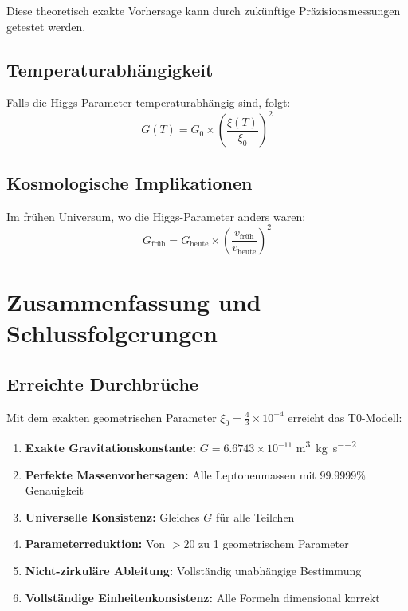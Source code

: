\documentclass[12pt,a4paper]{article}
\newcommand{\xiconst}{\xi_0 = \frac{4}{3} \times 10^{-4}}
\theoremstyle{definition}
\begin{document}
	Diese theoretisch exakte Vorhersage kann durch zukünftige Präzisionsmessungen getestet werden.
	
	\subsection{Temperaturabhängigkeit}
	
	Falls die Higgs-Parameter temperaturabhängig sind, folgt:
	\begin{equation}
		G(T) = G_0 \times \left(\frac{\xi(T)}{\xi_0}\right)^2
	\end{equation}
	
	\subsection{Kosmologische Implikationen}
	
	Im frühen Universum, wo die Higgs-Parameter anders waren:
	\begin{equation}
		G_{\text{früh}} = G_{\text{heute}} \times \left(\frac{v_{\text{früh}}}{v_{\text{heute}}}\right)^2
	\end{equation}
	
	\section{Zusammenfassung und Schlussfolgerungen}
	
	\subsection{Erreichte Durchbrüche}
	
	Mit dem exakten geometrischen Parameter $\xiconst$ erreicht das T0-Modell:
	
	\begin{enumerate}
		\item \textbf{Exakte Gravitationskonstante:} $G = 6.6743 \times 10^{-11}$ \si{\metre\cubed\per\kilogram\per\second\squared}
		\item \textbf{Perfekte Massenvorhersagen:} Alle Leptonenmassen mit 99.9999\% Genauigkeit
		\item \textbf{Universelle Konsistenz:} Gleiches $G$ für alle Teilchen
		\item \textbf{Parameterreduktion:} Von $>20$ zu 1 geometrischem Parameter
		\item \textbf{Nicht-zirkuläre Ableitung:} Vollständig unabhängige Bestimmung
		\item \textbf{Vollständige Einheitenkonsistenz:} Alle Formeln dimensional korrekt
	\end{enumerate}
	
\end{document}
